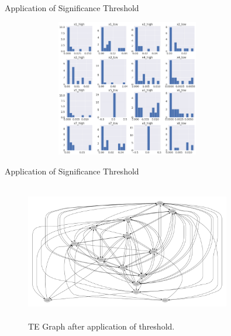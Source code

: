 \begin{frame}{Application of Significance Threshold}
    \begin{figure}
        \includegraphics[width=0.8\textwidth, height=60mm]{figuras/mult_hist.png}
    \end{figure}

\end{frame}



\begin{frame}{Application of Significance Threshold}
    \begin{figure}
        \includegraphics[width=0.8\textwidth, height=60mm]{figuras/vld_dot_graph.pdf}
        \caption{TE Graph after application of threshold.}
    \end{figure}
\end{frame}


